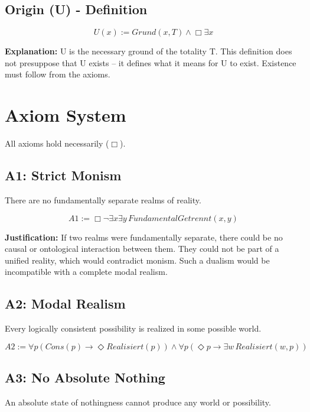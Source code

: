 \documentclass[
]{article}
\begin{document}
\subsection{Origin (U) - Definition}\label{origin-u-definition}

\[
\boxed{U(x) := Grund(x, T) \land \Box \exists x}
\]

\textbf{Explanation:} U is the necessary ground of the totality T. This definition does not presuppose that U exists -- it defines what it means for U to exist. Existence must follow from the axioms.

\section{Axiom System}\label{axiom-system}

All axioms hold necessarily (\(\Box\)).

\subsection{A1: Strict Monism}\label{a1-strict-monism}

There are no fundamentally separate realms of reality.

\[
\boxed{A1 := \Box\neg\exists x\exists y\, FundamentalGetrennt(x,y)}
\]

\textbf{Justification:} If two realms were fundamentally separate, there could be no causal or ontological interaction between them. They could not be part of a unified reality, which would contradict monism. Such a dualism would be incompatible with a complete modal realism.

\subsection{A2: Modal Realism}\label{a2-modal-realism}

Every logically consistent possibility is realized in some possible world.

\[
\boxed{A2 := \forall p(Cons(p) \rightarrow \Diamond Realisiert(p)) \land \forall p(\Diamond p \rightarrow \exists w\, Realisiert(w,p))}
\]

\subsection{A3: No Absolute Nothing}\label{a3-no-absolute-nothing}

An absolute state of nothingness cannot produce any world or possibility.
\end{document}
